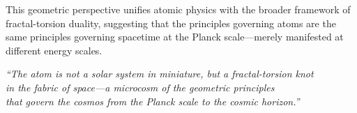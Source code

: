 This geometric perspective unifies atomic physics with the broader framework of fractal-torsion duality, suggesting that the principles governing atoms are the same principles governing spacetime at the Planck scale—merely manifested at different energy scales.

\begin{flushright}
\textit{``The atom is not a solar system in miniature, but a fractal-torsion knot \\in the fabric of space—a microcosm of the geometric principles \\that govern the cosmos from the Planck scale to the cosmic horizon.''}
\end{flushright}
